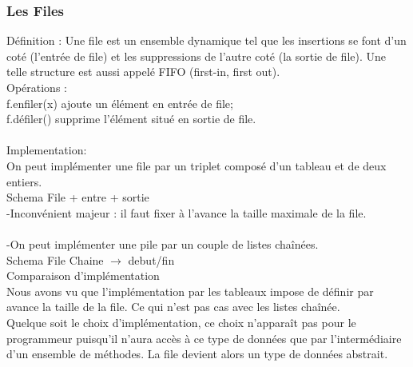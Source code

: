 \documentclass[5pt]{article}
\begin{document}
\begin{scriptsize}
\subsubsection{Les Files }
Définition : Une file est un ensemble dynamique tel que les insertions se font d’un coté (l’entrée de file) et les suppressions de l’autre coté (la sortie de file). Une telle structure est aussi appelé FIFO (first-in, first out).\\
Opérations :\\
f.enfiler(x) ajoute un élément en entrée de file;\\
f.défiler() supprime l’élément situé en sortie de file.\\
\\
Implementation:\\
On peut implémenter une file par un triplet composé d’un tableau  et de deux entiers. \\
Schema File + entre + sortie\\
-Inconvénient majeur : il faut fixer à l’avance  la taille maximale de la file.\\
\\
-On peut implémenter une pile par un couple de listes chaînées. \\
Schema File Chaine $\rightarrow$ debut/fin\\
Comparaison d’implémentation\\
Nous avons vu que l’implémentation par les tableaux impose de définir par avance la taille de la file. Ce qui n’est pas cas avec les listes chaînée.\\
Quelque soit le choix d’implémentation, ce choix n’apparaît pas pour le programmeur puisqu’il n’aura accès à ce type de données que par l’intermédiaire d’un ensemble de méthodes. La file devient alors un type de données abstrait.\\

\end{scriptsize}
\end{document}
